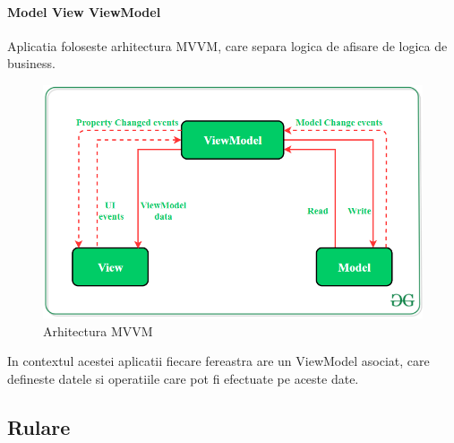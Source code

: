 \paragraph{Model View ViewModel}
Aplicatia foloseste arhitectura MVVM, care separa logica de afisare de logica de business.
\begin{figure}
    \centering
    \includegraphics[width=0.7\linewidth]{figs/mvvm.png}
    \caption{Arhitectura MVVM}
    \label{fig:mvvm}
\end{figure}
In contextul acestei aplicatii fiecare fereastra are un ViewModel asociat, care defineste
datele si operatiile care pot fi efectuate pe aceste date.

\subsection{Rulare}
